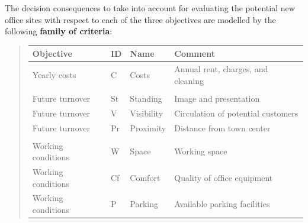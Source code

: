 \documentclass[letterpaper,10pt,english]{sphinxmanual}
\begin{document}
The decision consequences to take into account for evaluating the potential new office sites with respect to each of the three objectives are modelled by the following \textbf{family of criteria}:
\begin{quote}

\begin{tabulary}{\linewidth}{|L|L|L|L|}
\hline
\textsf{\relax 
Objective
} & \textsf{\relax 
ID
} & \textsf{\relax 
Name
} & \textsf{\relax 
Comment
}\\
\hline
Yearly costs
 & 
C
 & 
Costs
 & 
Annual rent, charges, and cleaning
\\
\hline

 & 

 & 

 & 

\\
\hline
Future turnover
 & 
St
 & 
Standing
 & 
Image and presentation
\\
\hline
Future turnover
 & 
V
 & 
Visibility
 & 
Circulation of potential customers
\\
\hline
Future turnover
 & 
Pr
 & 
Proximity
 & 
Distance from town center
\\
\hline

 & 

 & 

 & 

\\
\hline
Working conditions
 & 
W
 & 
Space
 & 
Working space
\\
\hline
Working conditions
 & 
Cf
 & 
Comfort
 & 
Quality of office equipment
\\
\hline
Working conditions
 & 
P
 & 
Parking
 & 
Available parking facilities
\\
\hline\end{tabulary}

\end{quote}
\end{document}
